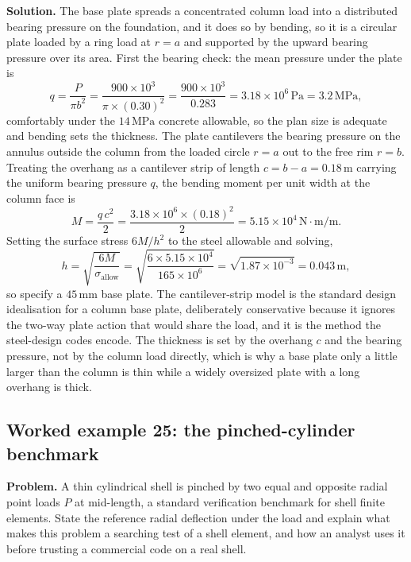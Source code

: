 \textbf{Solution.} The base plate spreads a concentrated column load into a
distributed bearing pressure on the foundation, and it does so by bending,
so it is a circular plate loaded by a ring load at $r = a$ and supported by
the upward bearing pressure over its area. First the bearing check: the
mean pressure under the plate is
\[
q = \frac{P}{\pi b^2} = \frac{900\times 10^3}{\pi\times (0.30)^2}
= \frac{900\times 10^3}{0.283} = 3.18\times 10^{6}\,\text{Pa}
= 3.2\,\text{MPa},
\]
comfortably under the $14\,\text{MPa}$ concrete allowable, so the plan size
is adequate and bending sets the thickness. The plate cantilevers the
bearing pressure on the annulus outside the column from the loaded circle
$r = a$ out to the free rim $r = b$. Treating the overhang as a cantilever
strip of length $c = b - a = 0.18\,\si{\meter}$ carrying the uniform
bearing pressure $q$, the bending moment per unit width at the column face
is
\[
M = \frac{q\,c^2}{2} = \frac{3.18\times 10^6\times (0.18)^2}{2}
= 5.15\times 10^{4}\,\text{N}\cdot\text{m}/\text{m}.
\]
Setting the surface stress $6M/h^2$ to the steel allowable and solving,
\[
h = \sqrt{\frac{6M}{\sigma_{\text{allow}}}}
= \sqrt{\frac{6\times 5.15\times 10^4}{165\times 10^6}}
= \sqrt{1.87\times 10^{-3}} = 0.043\,\text{m},
\]
so specify a $45\,\si{\milli\meter}$ base plate. The cantilever-strip model
is the standard design idealisation for a column base plate, deliberately
conservative because it ignores the two-way plate action that would share
the load, and it is the method the steel-design codes encode. The thickness
is set by the overhang $c$ and the bearing pressure, not by the column load
directly, which is why a base plate only a little larger than the column is
thin while a widely oversized plate with a long overhang is thick.

\subsection*{Worked example 25: the pinched-cylinder benchmark}

\textbf{Problem.} A thin cylindrical shell is pinched by two equal and
opposite radial point loads $P$ at mid-length, a standard verification
benchmark for shell finite elements. State the reference radial deflection
under the load and explain what makes this problem a searching test of a
shell element, and how an analyst uses it before trusting a commercial code
on a real shell.

